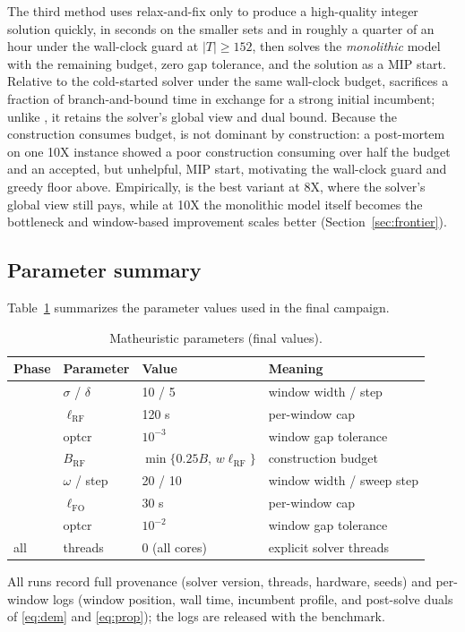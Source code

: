 The third method uses relax-and-fix only to produce a high-quality
integer solution quickly, in seconds on the smaller sets and in
roughly a quarter of an hour under the wall-clock guard at
$|T|\ge 152$, then solves the \emph{monolithic} model with the remaining budget,
zero gap tolerance, and the \RF{} solution as a MIP start. Relative
to the cold-started solver under the same wall-clock budget, \RFMIP{}
sacrifices a fraction of branch-and-bound time in exchange for a
strong initial incumbent; unlike \RFFO{}, it retains the solver's
global view and dual bound. Because the construction consumes budget, \RFMIP{} is not
dominant by construction: a post-mortem on one 10X instance showed a
poor construction consuming over half the budget and an accepted, but unhelpful, MIP start, motivating the wall-clock guard and
greedy floor above. Empirically, \RFMIP{} is the best variant at 8X,
where the solver's global view still pays, while at 10X the
monolithic model itself becomes the bottleneck and window-based
\FO{} improvement scales better (Section~\ref{sec:frontier}).

\subsection{Parameter summary}
\label{sec:params}

Table~\ref{tab:params} summarizes the parameter values used in the
final campaign.

\nopagebreak[4]
\begin{table}[H]
\centering
\caption{Matheuristic parameters (final values).}
\label{tab:params}
\begin{tabular}{llll}
\toprule
Phase & Parameter & Value & Meaning \\
\midrule
\RF{} & $\sigma$ / $\delta$ & 10 / 5 & window width / step \\
\RF{} & $\ell_{\mathrm{RF}}$ & 120 s & per-window cap \\
\RF{} & optcr & $10^{-3}$ & window gap tolerance \\
\RF{} & $B_{\mathrm{RF}}$ & $\min\{0.25B,\,w\ell_{\mathrm{RF}}\}$ &
construction budget \\
\FO{} & $\omega$ / step & 20 / 10 & window width / sweep step \\
\FO{} & $\ell_{\mathrm{FO}}$ & 30 s & per-window cap \\
\FO{} & optcr & $10^{-2}$ & window gap tolerance \\
all & threads & 0 (all cores) & explicit solver threads \\
\bottomrule
\end{tabular}
\end{table}

\noindent All runs record full provenance (solver version, threads,
hardware, seeds) and per-window logs (window position, wall time,
incumbent profile, and post-solve duals of \eqref{eq:dem} and
\eqref{eq:prop}); the logs are released with the benchmark.
